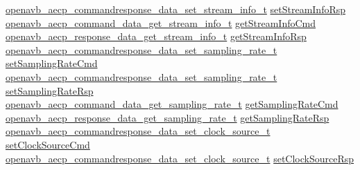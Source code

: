 \begin{DoxyCompactItemize}
\begin{tabbing}
\>\hyperlink{structopenavb__aecp__commandresponse__data__set__stream__info__t}{openavb\_aecp\_commandresponse\_data\_set\_stream\_info\_t} \hyperlink{structopenavb__aecp__entity__model__data__unit__t_a3db006e013828c95f60760e35fcf62c0}{setStreamInfoRsp}\\
\>\hyperlink{structopenavb__aecp__command__data__get__stream__info__t}{openavb\_aecp\_command\_data\_get\_stream\_info\_t} \hyperlink{structopenavb__aecp__entity__model__data__unit__t_adcfb85ef202fcbadc980c758ad16f927}{getStreamInfoCmd}\\
\>\hyperlink{structopenavb__aecp__response__data__get__stream__info__t}{openavb\_aecp\_response\_data\_get\_stream\_info\_t} \hyperlink{structopenavb__aecp__entity__model__data__unit__t_a1f013729708483caec862ffbc28974ef}{getStreamInfoRsp}\\
\>\hyperlink{structopenavb__aecp__commandresponse__data__set__sampling__rate__t}{openavb\_aecp\_commandresponse\_data\_set\_sampling\_rate\_t} \hyperlink{structopenavb__aecp__entity__model__data__unit__t_a15af08e0a9cc278eee59ee48c197e99f}{setSamplingRateCmd}\\
\>\hyperlink{structopenavb__aecp__commandresponse__data__set__sampling__rate__t}{openavb\_aecp\_commandresponse\_data\_set\_sampling\_rate\_t} \hyperlink{structopenavb__aecp__entity__model__data__unit__t_ac79342237361c321697b43561a6076aa}{setSamplingRateRsp}\\
\>\hyperlink{structopenavb__aecp__command__data__get__sampling__rate__t}{openavb\_aecp\_command\_data\_get\_sampling\_rate\_t} \hyperlink{structopenavb__aecp__entity__model__data__unit__t_a910ae8fb1fc20ba0a95dee1256eb15d6}{getSamplingRateCmd}\\
\>\hyperlink{structopenavb__aecp__response__data__get__sampling__rate__t}{openavb\_aecp\_response\_data\_get\_sampling\_rate\_t} \hyperlink{structopenavb__aecp__entity__model__data__unit__t_a831aec65238bdd15555b165f24239e61}{getSamplingRateRsp}\\
\>\hyperlink{structopenavb__aecp__commandresponse__data__set__clock__source__t}{openavb\_aecp\_commandresponse\_data\_set\_clock\_source\_t} \hyperlink{structopenavb__aecp__entity__model__data__unit__t_abde6fd6788e26fb9f65241bd84326448}{setClockSourceCmd}\\
\>\hyperlink{structopenavb__aecp__commandresponse__data__set__clock__source__t}{openavb\_aecp\_commandresponse\_data\_set\_clock\_source\_t} \hyperlink{structopenavb__aecp__entity__model__data__unit__t_a1a74f62182260ba79e92a2ebd2021b2c}{setClockSourceRsp}\\

\end{tabbing}
\end{DoxyCompactItemize}
